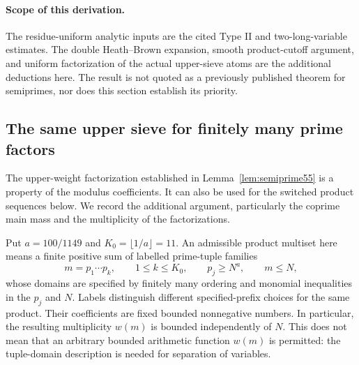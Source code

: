 \documentclass[11pt]{article}
\begin{document}
\paragraph{Scope of this derivation.}
The residue-uniform analytic inputs are the cited Type II and
two-long-variable estimates. The double Heath--Brown expansion,
smooth product-cutoff argument, and uniform factorization of
the actual upper-sieve atoms are the additional deductions here.
The result is not quoted as a previously published theorem for
semiprimes, nor does this section establish its priority.


\subsection{The same upper sieve for finitely many prime factors}
\label{sec:primeproducts55}

The upper-weight factorization established in
Lemma~\ref{lem:semiprime55} is a property of the modulus coefficients.
It can also be used for the switched product sequences below.
We record the additional argument, particularly the coprime main
mass and the multiplicity of the factorizations.

Put $a=100/1149$ and $K_0=\lfloor1/a\rfloor=11$.
An admissible product multiset here means a finite positive sum
of labelled prime-tuple families
\[
 m=p_1\cdots p_k,\qquad 1\le k\le K_0,
 \qquad p_j\ge N^a,\qquad m\le N,
\]
whose domains are specified by finitely many ordering and monomial
inequalities in the $p_j$ and $N$. Labels distinguish different
specified-prefix choices for the same product.
Their coefficients are fixed bounded nonnegative numbers.
In particular, the resulting multiplicity $w(m)$ is bounded
independently of $N$. This does not mean that an arbitrary
bounded arithmetic function $w(m)$ is permitted: the tuple-domain
description is needed for separation of variables.
\end{document}
